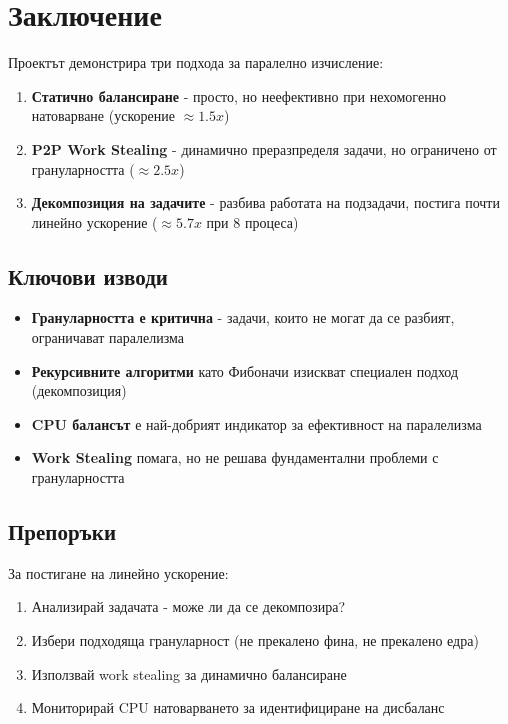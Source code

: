 \documentclass[12pt,a4paper]{article}
\begin{document}
\section{Заключение}

Проектът демонстрира три подхода за паралелно изчисление:

\begin{enumerate}
    \item \textbf{Статично балансиране} - просто, но неефективно при нехомогенно натоварване (ускорение $\approx 1.5x$)

    \item \textbf{P2P Work Stealing} - динамично преразпределя задачи, но ограничено от грануларността ($\approx 2.5x$)

    \item \textbf{Декомпозиция на задачите} - разбива работата на подзадачи, постига почти линейно ускорение ($\approx 5.7x$ при 8 процеса)
\end{enumerate}

\subsection{Ключови изводи}

\begin{itemize}
    \item \textbf{Грануларността е критична} - задачи, които не могат да се разбият, ограничават паралелизма
    \item \textbf{Рекурсивните алгоритми} като Фибоначи изискват специален подход (декомпозиция)
    \item \textbf{CPU балансът} е най-добрият индикатор за ефективност на паралелизма
    \item \textbf{Work Stealing} помага, но не решава фундаментални проблеми с грануларността
\end{itemize}

\subsection{Препоръки}

За постигане на линейно ускорение:
\begin{enumerate}
    \item Анализирай задачата - може ли да се декомпозира?
    \item Избери подходяща грануларност (не прекалено фина, не прекалено едра)
    \item Използвай work stealing за динамично балансиране
    \item Мониторирай CPU натоварването за идентифициране на дисбаланс
\end{enumerate}
\end{document}
